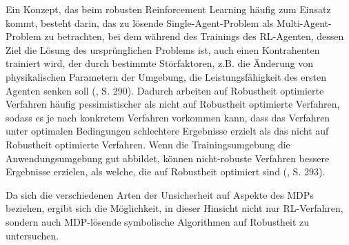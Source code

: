 Ein Konzept, das beim robusten Reinforcement Learning häufig zum Einsatz kommt, besteht darin, das zu lösende Single-Agent-Problem als Multi-Agent-Problem zu betrachten, bei dem während des Trainings des RL-Agenten, dessen Ziel die Lösung des ursprünglichen Problems ist, auch einen Kontrahenten trainiert wird, der durch bestimmte Störfaktoren, z.B. die Änderung von physikalischen Parametern der Umgebung, die Leistungsfähigkeit des ersten Agenten senken soll (\cite{Moos}, S. 290). Dadurch arbeiten auf Robustheit optimierte Verfahren häufig pessimistischer als nicht auf Robustheit optimierte Verfahren, sodass es je nach konkretem Verfahren vorkommen kann, dass das Verfahren unter optimalen Bedingungen schlechtere Ergebnisse erzielt als das nicht auf Robustheit optimierte Verfahren. Wenn die Trainingsumgebung die Anwendungsumgebung gut abbildet, können nicht-robuste Verfahren bessere Ergebnisse erzielen, als welche, die auf Robustheit optimiert sind (\cite{Moos}, S. 293).

Da sich die verschiedenen Arten der Unsicherheit auf Aspekte des MDPs beziehen, ergibt sich die Möglichkeit, in dieser Hinsicht nicht nur RL-Verfahren, sondern auch MDP-lösende symbolische Algorithmen auf Robustheit zu untersuchen.
